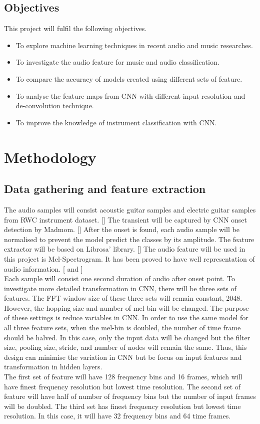 \documentclass{article}
\begin{document}
\subsection{Objectives}
This project will fulfil the following objectives.
\begin{itemize}
\item To explore machine learning techniques in recent audio and music researches.
\item To investigate the audio feature for music and audio classification.
\item To compare the accuracy of models created using different sets of feature.
\item To analyse the feature maps from CNN with different input resolution and de-convolution technique.
\item To improve the knowledge of instrument classification with CNN.
\end{itemize}

\section{Methodology}
\subsection{Data gathering and feature extraction}
    The audio samples will consist acoustic guitar samples and electric guitar samples from RWC instrument dataset. {[\cite{goto2003rwc}]} The transient will be captured by CNN onset detection by Madmom. {[\cite{bock2016madmom}]} After the onset is found, each audio sample will be normalised to prevent the model predict the classes by its amplitude. The feature extractor will be based on Librosa' library. {[\citep{mcfee2015librosa}]} The audio feature will be used in this project is Mel-Spectrogram. It has been proved to have well representation of audio information. {[\cite{choi2016explaining} and \cite{choi2015auralisation}]}\\
    Each sample will consist one second duration of audio after onset point. To investigate more detailed transformation in CNN, there will be three sets of features. The FFT window size of these three sets will remain constant, 2048. However, the hopping size and number of mel bin will be changed. The purpose of these settings is reduce variables in CNN. In order to use the same model for all three feature sets, when the mel-bin is doubled, the number of time frame should be halved. In this case, only the input data will be changed but the filter size, pooling size, stride, and number of nodes will remain the same. Thus, this design can minimise the variation in CNN but be focus on input features and transformation in hidden layers.\\
    The first set of feature will have 128 frequency bins and 16 frames, which will have finest frequency resolution but lowest time resolution. The second set of feature will have half of number of frequency bins but the number of input frames will be doubled. The third set has finest frequency resolution but lowest time resolution. In this case, it will have 32 frequency bins and 64 time frames.
 
\end{document}
